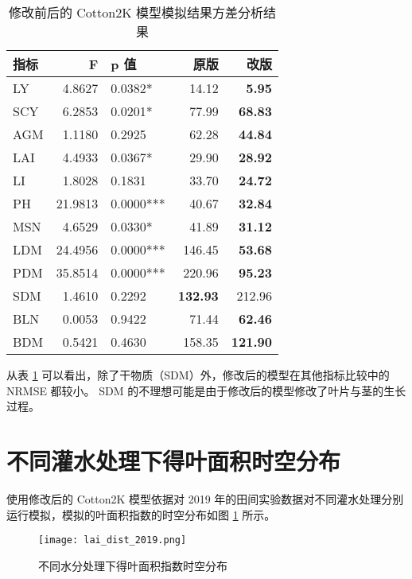 \begin{table}
    \caption{修改前后的 Cotton2K 模型模拟结果方差分析结果}\label{tab:stats}
    \centering
    \begin{tabular}{lrlrr}
        \toprule
        指标 & F       & p 值      & 原版            & 改版            \\
        \midrule
        LY   & 4.8627  & 0.0382*   & 14.12           & \textbf{5.95}   \\
        SCY  & 6.2853  & 0.0201*   & 77.99           & \textbf{68.83}  \\
        AGM  & 1.1180  & 0.2925    & 62.28           & \textbf{44.84}  \\
        LAI  & 4.4933  & 0.0367*   & 29.90           & \textbf{28.92}  \\
        LI   & 1.8028  & 0.1831    & 33.70           & \textbf{24.72}  \\
        PH   & 21.9813 & 0.0000*** & 40.67           & \textbf{32.84}  \\
        MSN  & 4.6529  & 0.0330*   & 41.89           & \textbf{31.12}  \\
        LDM  & 24.4956 & 0.0000*** & 146.45          & \textbf{53.68}  \\
        PDM  & 35.8514 & 0.0000*** & 220.96          & \textbf{95.23}  \\
        SDM  & 1.4610  & 0.2292    & \textbf{132.93} & 212.96          \\
        BLN  & 0.0053  & 0.9422    & 71.44           & \textbf{62.46}  \\
        BDM  & 0.5421  & 0.4630    & 158.35          & \textbf{121.90} \\
        \bottomrule
    \end{tabular}
\end{table}

从表 \ref{tab:stats} 可以看出，除了干物质（SDM）外，修改后的模型在其他指标比较中的 NRMSE 都较小。%
SDM 的不理想可能是由于修改后的模型修改了叶片与茎的生长过程。%

\section{不同灌水处理下得叶面积时空分布}

使用修改后的 Cotton2K 模型依据对 2019 年的田间实验数据对不同灌水处理分别运行模拟，模拟的叶面积指数的时空分布如图 \ref{fig:laiDist} 所示。

\begin{figure}
    \centering
    \texttt{[image: lai\_dist\_2019.png]}
    \caption{不同水分处理下得叶面积指数时空分布}\label{fig:laiDist}
\end{figure}

